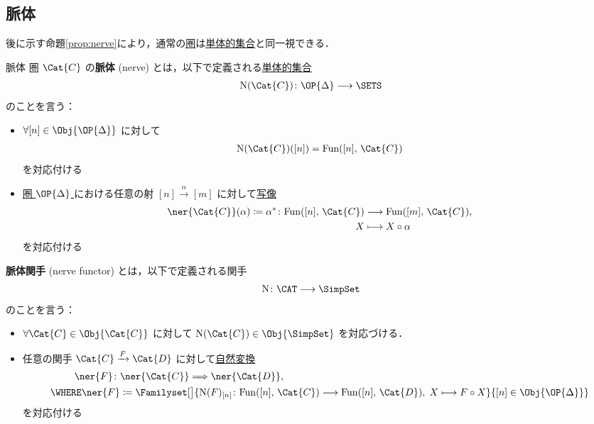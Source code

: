 \documentclass[TQFT_main]{subfiles}
\begin{document}
\subsection{脈体}

後に示す命題\ref{prop:nerve}により，通常の\hyperref[def:category]{圏}は\hyperref[def:SimpSet]{単体的集合}と同一視できる．

\begin{mydef}[label=def:nerve]{脈体}
        圏 $\Cat{C}$ の\textbf{脈体} (nerve) とは，以下で定義される\hyperref[def:SimpSet]{単体的集合}
        \begin{align}
            \mathrm{N}(\Cat{C}) \colon \OP{\Delta} \lto \SETS
        \end{align}
        のことを言う：
        \begin{itemize}
            \item $\forall [n] \in \Obj{\OP{\Delta}}$ に対して
            \begin{align}
                \mathrm{N}(\Cat{C}) ([n]) = \mathrm{Fun} ([n],\, \Cat{C})
            \end{align}
            を対応付ける
            \item \hyperref[def:simplex-cat]{圏 $\OP{\Delta}$ }における任意の射 $[n] \xrightarrow{\alpha} [m]$ に対して\underline{写像}
            \begin{align}
                \ner{\Cat{C}}(\alpha) \coloneqq \alpha^* \colon \mathrm{Fun}([n],\, \Cat{C}) &\lto \mathrm{Fun}([m],\, \Cat{C}),\\ 
                X &\lmto X \circ \alpha
            \end{align}
            を対応付ける
        \end{itemize}

        \tcblower

        \textbf{脈体関手} (nerve functor) とは，以下で定義される関手
        \begin{align}
            \mathrm{N} \colon \CAT \lto \SimpSet
        \end{align}
        のことを言う：
        \begin{itemize}
            \item $\forall \Cat{C} \in \Obj{\Cat{C}}$ に対して $\mathrm{N}(\Cat{C}) \in \Obj{\SimpSet}$ を対応づける．
            \item 任意の関手 $\Cat{C} \xrightarrow{F} \Cat{D}$ に対して\hyperref[def:nat]{自然変換}
            \begin{align}
                \ner{F} \colon &\ner{\Cat{C}} \Longrightarrow \ner{\Cat{D}}, \\
                \WHERE \ner{F} &\coloneqq \Familyset[\big]{\mathrm{N}(F)_{[n]} \colon \mathrm{Fun}([n],\, \Cat{C}) \lto \mathrm{Fun}([n],\, \Cat{D}),\; X \lmto F \circ X}{[n] \in \Obj{\OP{\Delta}}}
            \end{align}
            を対応付ける
        \end{itemize}
\end{mydef}
\end{document}
